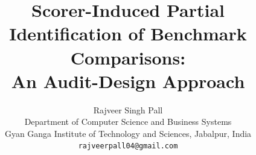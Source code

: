 \documentclass{article}
\title{Scorer-Induced Partial Identification of Benchmark Comparisons:\\
An Audit-Design Approach}
\author{
  Rajveer Singh Pall \\
  Department of Computer Science and Business Systems \\
  Gyan Ganga Institute of Technology and Sciences, Jabalpur, India \\
  \texttt{rajveerpall04@gmail.com}
}
\begin{document}
\maketitle














{\small


}

\appendix

\end{document}
